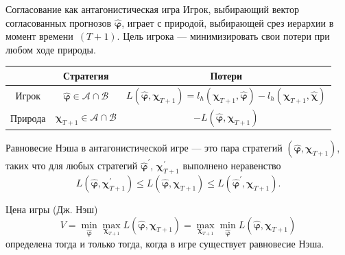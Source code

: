 \documentclass{beamer}
\newcommand{\A}{\mathcal{A}}
\newcommand{\hchi}{\hat{\boldsymbol{\chi}}}
\newcommand{\hphi}{\hat{\boldsymbol{\varphi}}}
\newcommand{\B}{\mathcal{B}}
\begin{document}
\begin{frame}{Согласование как антагонистическая игра}
\footnotesize
    Игрок, выбирающий вектор согласованных прогнозов $\hphi$,
    играет с природой, выбирающей срез иерархии в момент времени~$(T+1)$.
    Цель игрока --- минимизировать свои потери при любом
    ходе природы.
    \vfill
    \begin{tabular}{|c|c|c|}
        \hline
         & Стратегия & Потери \\
         \hline
         Игрок & $\hphi \in \A \cap \B$ & $L(\hphi, \boldsymbol{\chi}_{T+1}) =
         l_h(\boldsymbol{\chi}_{T+1}, \hphi) - l_h(\boldsymbol{\chi}_{T+1}, \hchi)$ \\
         \hline
         Природа & $\boldsymbol{\chi}_{T+1} \in \A \cap \B$ & $-L(\hphi, \boldsymbol{\chi}_{T+1})$ \\
         \hline
    \end{tabular}
    \vfill

    \begin{block}{Равновесие Нэша в антагонистической игре --- это}
        пара стратегий $(\hphi, \boldsymbol{\chi}_{T+1})$, таких что для
        любых стратегий $\hphi^{\prime}$, $\boldsymbol{\chi}_{T+1}^{\prime}$
        выполнено неравенство
        $$
            L(\hphi, \boldsymbol{\chi}_{T+1}^{\prime}) \leq L(\hphi,
            \boldsymbol{\chi}_{T+1}) \leq L(\hphi^{\prime}, \boldsymbol{\chi}_{T+1}).
        $$
    \end{block}

    \begin{block}{Цена игры (Дж. Нэш)}
        $$
            V = \min\limits_{\hphi} \max\limits_{\boldsymbol{\chi}_{T+1}} L(\hphi, \boldsymbol{\chi}_{T+1}) =
                \max\limits_{\boldsymbol{\chi}_{T+1}} \min\limits_{\hphi} L(\hphi, \boldsymbol{\chi}_{T+1})
        $$
        определена тогда и только тогда, когда в игре существует
        равновесие Нэша.
    \end{block}

\end{frame}
\end{document}
